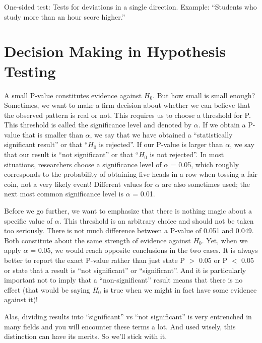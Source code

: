 \documentclass[
  letterpaper,
]{book}
\begin{document}
One-sided test: Tests for deviations in a single direction. Example:
``Students who study more than an hour score higher.''

\section*{Decision Making in Hypothesis
Testing}\label{decision-making-in-hypothesis-testing}


A small P-value constitutes evidence against \(H_0\). But how small is
small enough? Sometimes, we want to make a firm decision about whether
we can believe that the observed pattern is real or not. This requires
us to choose a threshold for P. This threshold is called the
significance level and denoted by \(\alpha\). If we obtain a P-value
that is smaller than \(\alpha\), we say that we have obtained a
``statistically significant result'' or that ``\(H_0\) is rejected''. If
our P-value is larger than \(\alpha\), we say that our result is ``not
significant'' or that ``\(H_0\) is not rejected''. In most situations,
researchers choose a significance level of \(\alpha\) = 0.05, which
roughly corresponds to the probability of obtaining five heads in a row
when tossing a fair coin, not a very likely event! Different values for
\(\alpha\) are also sometimes used; the next most common significance
level is \(\alpha\) = 0.01.

Before we go further, we want to emphasize that there is nothing magic
about a specific value of \(\alpha\). This threshold is an arbitrary
choice and should not be taken too seriously. There is not much
difference between a P-value of 0.051 and 0.049. Both constitute about
the same strength of evidence against \(H_0\). Yet, when we apply
\(\alpha\) = 0.05, we would reach opposite conclusions in the two cases.
It is always better to report the exact P-value rather than just state P
\(>\) 0.05 or P \(<\) 0.05 or state that a result is ``not significant''
or ``significant''. And it is particularly important not to imply that a
``non-significant'' result means that there is no effect (that would be
saying \(H_0\) is true when we might in fact have some evidence against
it)!

Alas, dividing results into ``significant'' vs ``not significant'' is
very entrenched in many fields and you will encounter these terms a lot.
And used wisely, this distinction can have its merits. So we'll stick
with it.
\end{document}
